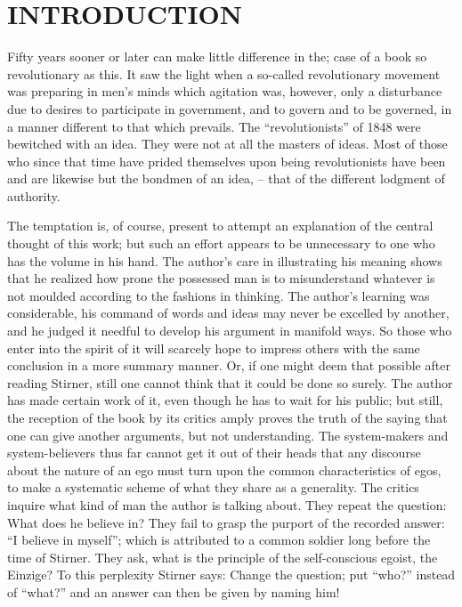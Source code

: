 
\chapter[Introduction]{\centering INTRODUCTION}

Fifty years sooner or later can make little difference in the; case of a book 
so revolutionary as this. It saw the light when a so-called revolutionary 
movement was preparing in men's minds which agitation was, however, only a 
disturbance due to desires to participate in government, and to govern and to 
be governed, in a manner different to that which prevails. The 
``revolutionists'' of 1848 were bewitched with an idea. They were not at all 
the masters of ideas. Most of those who since that time have prided themselves 
upon being revolutionists have been and are likewise but the bondmen of an 
idea, -- that of the different lodgment of authority.

The temptation is, of course, present to attempt an explanation of the central 
thought of this work; but such an effort appears to be unnecessary to one who 
has the volume in his hand. The author's care in illustrating his meaning 
shows that he realized how prone the possessed man is to misunderstand 
whatever is not moulded according to the fashions in thinking. The author's 
learning was considerable, his command of words and ideas may never be 
excelled by another, and he judged it needful to develop his argument in 
manifold ways. So those who enter into the spirit of it will scarcely hope to 
impress others with the same conclusion in a more summary manner. Or, if one 
might deem that possible after reading Stirner, still one cannot think that it 
could be done so surely. The author has made certain work of it, even though 
he has to wait for his public; but still, the reception of the book by its 
critics amply proves the truth of the saying that one can give another 
arguments, but not understanding. The system-makers and system-believers thus 
far cannot get it out of their heads that any discourse about the nature of an 
ego must turn upon the common characteristics of egos, to make a systematic 
scheme of what they share as a generality. The critics inquire what kind of 
man the author is talking about. They repeat the question: What does he 
believe in? They fail to grasp the purport of the recorded answer: ``I 
believe in myself''; which is attributed to a common soldier long before the 
time of Stirner. They ask, what is the principle of the self-conscious egoist, 
the Einzige? To this perplexity Stirner says: Change the question; put 
``who?'' instead of ``what?'' and an answer can then be given by naming 
him!

